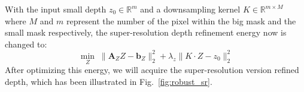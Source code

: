 With the input small depth $z_0\in\mathbb{R}^m$ and a downsampling kernel $K \in \mathbb{R}^{m\times M}$ where $M$ and $m$ represent the number of the pixel within the big mask and the small mask respectively, the super-resolution depth refinement energy now is changed to:
 \begin{equation}\label{eq:robust_depth_estimate}
    \min_{Z} \; \lVert  \mathbf{A}_{Z}Z - \mathbf{b}_Z\rVert^2_2 + \lambda_{z}\lVert K\cdot Z - z_0 \rVert_2^2
\end{equation}
 After optimizing this energy, we will acquire the super-resolution version refined depth, which has been illustrated in Fig.~\ref{fig:robust_sr}.
  \begin{figure}[!htbp]
\centering
{}

\end{figure}
